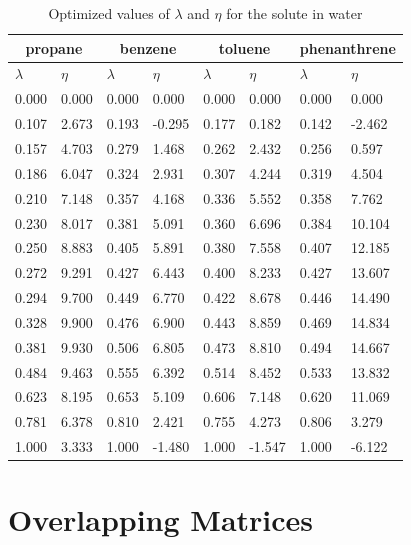 \documentclass[
	12pt,				%
	openright,			%
	oneside,			%
	a4paper,			%
	english,			%
	brazil				%
	]{abntex2}
\begin{document}
\begin{apendicesenv}
\begin{table}[h]
	\centering
	\caption{Optimized values of $\lambda$ and $\eta$ for the solute in water }
	\begin{tabular}{llllllll}
		\hline
		\multicolumn{2}{c}{propane}& \multicolumn{2}{c}{benzene}& \multicolumn{2}{c}{toluene}& \multicolumn{2}{c}{phenanthrene}\\
		\hline
		$\lambda$ & $\eta$ & $\lambda$ & $\eta$  & $\lambda$ & $\eta$  & $\lambda$ & $\eta$ \\ 
		\hline
0.000	&	0.000	&	0.000	&	0.000	&	0.000	&	0.000	&	0.000	&	0.000	\\
0.107	&	2.673	&	0.193	&	-0.295	&	0.177	&	0.182	&	0.142	&	-2.462	\\
0.157	&	4.703	&	0.279	&	1.468	&	0.262	&	2.432	&	0.256	&	0.597	\\
0.186	&	6.047	&	0.324	&	2.931	&	0.307	&	4.244	&	0.319	&	4.504	\\
0.210	&	7.148	&	0.357	&	4.168	&	0.336	&	5.552	&	0.358	&	7.762	\\
0.230	&	8.017	&	0.381	&	5.091	&	0.360	&	6.696	&	0.384	&	10.104	\\
0.250	&	8.883	&	0.405	&	5.891	&	0.380	&	7.558	&	0.407	&	12.185	\\
0.272	&	9.291	&	0.427	&	6.443	&	0.400	&	8.233	&	0.427	&	13.607	\\
0.294	&	9.700	&	0.449	&	6.770	&	0.422	&	8.678	&	0.446	&	14.490	\\
0.328	&	9.900	&	0.476	&	6.900	&	0.443	&	8.859	&	0.469	&	14.834	\\
0.381	&	9.930	&	0.506	&	6.805	&	0.473	&	8.810	&	0.494	&	14.667	\\
0.484	&	9.463	&	0.555	&	6.392	&	0.514	&	8.452	&	0.533	&	13.832	\\
0.623	&	8.195	&	0.653	&	5.109	&	0.606	&	7.148	&	0.620	&	11.069	\\
0.781	&	6.378	&	0.810	&	2.421	&	0.755	&	4.273	&	0.806	&	3.279	\\
1.000	&	3.333	&	1.000	&	-1.480	&	1.000	&	-1.547	&	1.000	&	-6.122	\\


		\hline
	\end{tabular}
\end{table}
\chapter{Overlapping Matrices}


\end{apendicesenv}
\end{document}
